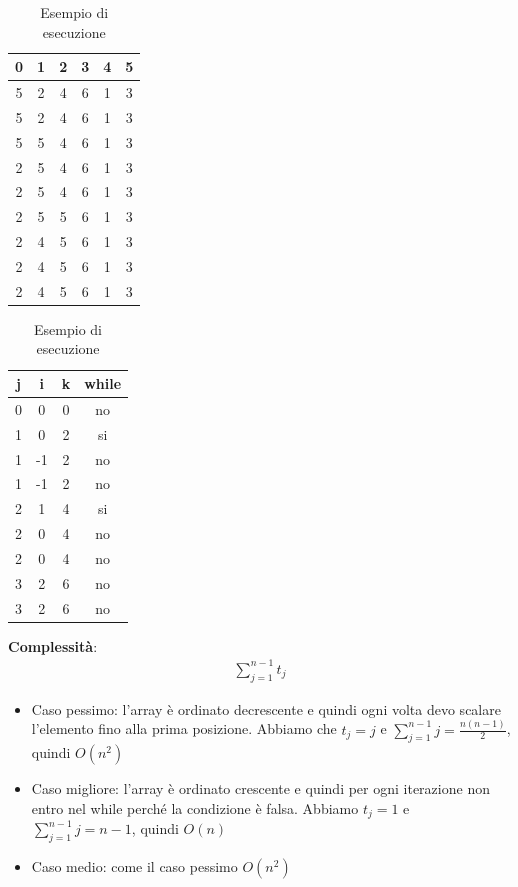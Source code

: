 \begin{table}[h]
	\centering
	\begin{tabular}{ |c|c|c|c|c|c| }
		\hline
		0 & 1 & 2 & 3 & 4 & 5 \\
		\hline
		5 & 2 & 4 & 6 & 1 & 3 \\
		\hline 
		5 & 2 & 4 & 6 & 1 & 3 \\
		\hline 
		5 & 5 & 4 & 6 & 1 & 3 \\
		\hline 
		2 & 5 & 4 & 6 & 1 & 3 \\
		\hline 
		2 & 5 & 4 & 6 & 1 & 3 \\
		\hline 
		2 & 5 & 5 & 6 & 1 & 3 \\
		\hline 
		2 & 4 & 5 & 6 & 1 & 3 \\
		\hline 
		2 & 4 & 5 & 6 & 1 & 3 \\
		\hline 
		2 & 4 & 5 & 6 & 1 & 3 \\
		\hline 
	\end{tabular}
	\begin{tabular} { |c|c|c|c|}
		\hline
		j & i & k & while \\
		\hline
		0 & 0 & 0 & no \\
		\hline
		1 & 0 & 2 & si \\
		\hline
		1 & -1 & 2 & no \\
		\hline
		1 & -1 & 2 & no \\
		\hline
		2 & 1 & 4 & si \\
		\hline
		2 & 0 & 4 & no \\
		\hline
		2 & 0 & 4 & no \\
		\hline
		3 & 2 & 6 & no \\
		\hline
		3 & 2 & 6 & no \\
		\hline
	\end{tabular}
	\caption{Esempio di esecuzione}
\end{table}
\textbf{Complessità}:
\begin{align*}
	\sum\limits_{j=1}^{n-1} t_j
\end{align*}
\begin{itemize}
	\item Caso pessimo: l'array è ordinato decrescente e quindi ogni volta devo scalare l'elemento fino alla prima posizione. Abbiamo che $t_j = j$ e $\sum\limits_{j=1}^{n-1} j = \frac{n(n-1)}{2}$, quindi $O(n^2)$
	\item Caso migliore: l'array è ordinato crescente e quindi per ogni iterazione non entro nel while perché la condizione è falsa. Abbiamo $t_j = 1$ e $\sum\limits_{j=1}^{n-1} j = n-1$, quindi $O(n)$
	\item Caso medio: come il caso pessimo $O(n^2)$
\end{itemize}
